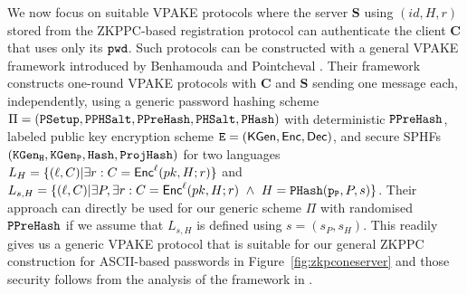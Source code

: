 We now focus on suitable VPAKE protocols where the server $\bm{S}$ using $(id, H, r)$ stored from the ZKPPC-based registration protocol can authenticate the client $\bm{C}$ that uses only its $\mathtt{pwd}$. 
Such protocols can be constructed with a general VPAKE framework introduced by Benhamouda and Pointcheval \cite{BenhamoudaP13}. 
Their framework constructs one-round VPAKE protocols with $\bm{C}$ and $\bm{S}$ sending one message each, independently, using a generic password hashing scheme $\Pi=(\mathtt{PSetup},\allowbreak\mathtt{PPHSalt},\allowbreak\mathtt{PPreHash},\mathtt{PHSalt},\allowbreak\mathtt{PHash})$ with deterministic $\mathtt{PPreHash}$, labeled public key encryption scheme $\mathtt{E} = (\mathsf{KGen},\allowbreak \mathsf{Enc}, \mathsf{Dec})$, and secure SPHFs $(\mathtt{KGen_H},\allowbreak\mathtt{KGen_P},\allowbreak\mathtt{Hash},\allowbreak\mathtt{ProjHash})$ for two languages $L_H = \{(\ell, C) | \exists r : C = \mathsf{Enc}^\ell(pk, H; r)\}$ and $L_{s,H}  = \{(\ell, C) | \exists P, \exists r : C = \mathsf{Enc}^\ell(pk, H; r)\ \wedge\ H = \mathtt{PHash}(\mathtt{p_P},\allowbreak P, s)\}$. 
Their approach can directly be used for our generic scheme $\Pi$ with randomised $\mathtt{PPreHash}$ if we assume that $L_{s,H}$ is defined using $s=(s_P,s_H)$. 
This readily gives us a generic VPAKE protocol that is suitable for our general ZKPPC construction for ASCII-based passwords in Figure~\ref{fig:zkpconeserver} and those security follows from the analysis of the framework in \cite{BenhamoudaP13}.

